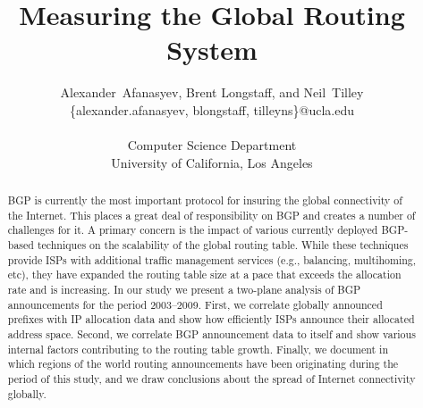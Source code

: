 \documentclass[journal,final]{IEEEtran}%
\title{Measuring the Global Routing System}
\author{
Alexander~Afanasyev, %
Brent Longstaff, and Neil~Tilley \\
\small \{alexander.afanasyev, blongstaff, tilleyns\}@ucla.edu \\ \ \\
\small Computer Science Department \\
\small University of California, Los Angeles
}
\begin{document}
\maketitle

\begin{abstract} %

BGP is currently the most important protocol for insuring the global
connectivity of the Internet. This places a great deal of responsibility on BGP
and creates a number of challenges for it. A primary concern is the impact of
various currently deployed BGP-based techniques on the scalability of the
global routing table. While these techniques provide ISPs with additional
traffic management services (e.g., balancing, multihoming, etc), they have
expanded the routing table size at a pace that exceeds the allocation rate and
is increasing. In our study we present a two-plane analysis of BGP
announcements for the period 2003--2009. First, we correlate globally announced
prefixes with IP allocation data and show how efficiently ISPs announce their
allocated address space. Second, we correlate BGP announcement data to itself
and show various internal factors contributing to the routing table growth.
Finally, we document in which regions of the world routing announcements have
been originating during the period of this study, and we draw conclusions about
the spread of Internet connectivity globally.


\end{abstract}











%
%



\end{document}
